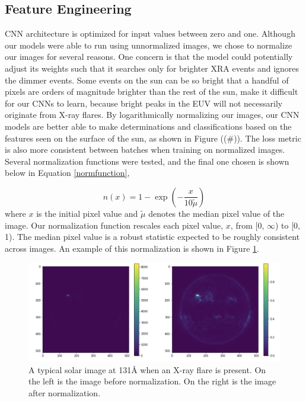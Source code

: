 \documentclass[12pt, letterpaper]{article}
\begin{document}
\subsection*{Feature Engineering}
CNN architecture is optimized for input values between zero and one. Although our models were able to run using unnormalized images, we chose to normalize our images for several reasons. One concern is that the model could potentially adjust its weights such that it searches only for brighter XRA events and ignores the dimmer events. Some events on the sun can be so bright that a handful of pixels are orders of magnitude brighter than the rest of the sun, make it difficult for our CNNs to learn, because bright peaks in the EUV will not necessarily originate from X-ray flares. By logarithmically normalizing our images, our CNN models are better able to make determinations and classifications based on the features seen on the surface of the sun, as shown in Figure ((#)). The loss metric is also more consistent between batches when training on normalized images. Several normalization functions were tested, and the final one chosen is shown below in Equation \ref{normfunction},

\begin{equation}
    \label{normfunction}
    n(x) = 1 - \exp\left(-\frac{x}{10\tilde{\mu}}\right)
\end{equation}
where $x$ is the initial pixel value and $\tilde{\mu}$ denotes the median pixel value of the image. Our normalization function rescales each pixel value, $x$, from [0, $\infty$) to [0, 1). The median pixel value is a robust statistic expected to be roughly consistent across images. An example of this normalization is shown in Figure \ref{norm_example}.

\begin{figure}[h]
	\centering
	\includegraphics[width=\textwidth]{figures/normalization_comp.png}
	\caption{A typical solar image at 131Å when an X-ray flare is present. On the left is the image before normalization. On the right is the image after normalization.}
	\label{norm_example}
\end{figure}
\end{document}

